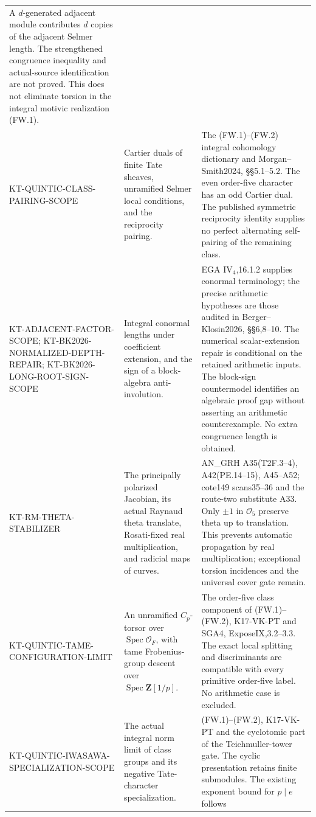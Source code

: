 \begin{longtable}{>{\raggedright\arraybackslash}p{}
>{\raggedright\arraybackslash}p{}
>{\raggedright\arraybackslash}p{}}
A $d$-generated adjacent module contributes $d$ copies of the
adjacent Selmer length. The strengthened congruence inequality
and actual-source identification are not proved. This does not
eliminate torsion in the integral motivic realization (FW.1).\\
KT-QUINTIC-CLASS-PAIRING-SCOPE &
Cartier duals of finite Tate sheaves, unramified Selmer local
conditions, and the reciprocity pairing. &
The (FW.1)--(FW.2) integral cohomology dictionary and
Morgan--Smith2024, \S\S5.1--5.2.
The even order-five character has an odd Cartier dual.
The published symmetric reciprocity identity supplies no
perfect alternating self-pairing of the remaining class.\\
KT-ADJACENT-FACTOR-SCOPE;
KT-BK2026-NORMALIZED-DEPTH-REPAIR;
KT-BK2026-LONG-ROOT-SIGN-SCOPE &
Integral conormal lengths under coefficient extension,
and the sign of a block-algebra anti-involution. &
EGA IV$_4$,16.1.2 supplies conormal terminology;
the precise arithmetic hypotheses are those audited in
Berger--Klosin2026, \S\S6,8--10.
The numerical scalar-extension repair is conditional on
the retained arithmetic inputs. The block-sign countermodel
identifies an algebraic proof gap without asserting an
arithmetic counterexample. No extra congruence length is obtained.\\
KT-RM-THETA-STABILIZER &
The principally polarized Jacobian, its actual Raynaud theta
translate, Rosati-fixed real multiplication, and radicial
maps of curves. &
AN\_GRH A35(T2F.3--4), A42(PE.14--15), A45--A52;
cote149 scans35--36 and the route-two substitute A33.
Only $\pm1$ in $\mathcal O_5$ preserve theta up to translation.
This prevents automatic propagation by real multiplication;
exceptional torsion incidences and the universal cover gate remain.\\
KT-QUINTIC-TAME-CONFIGURATION-LIMIT &
An unramified $C_p$-torsor over $\operatorname{Spec}\mathcal O_F$,
with tame Frobenius-group descent over $\operatorname{Spec}\mathbf Z[1/p]$. &
The order-five class component of (FW.1)--(FW.2),
K17-VK-PT and SGA4, ExposeIX,3.2--3.3.
The exact local splitting and discriminants are compatible
with every primitive order-five label. No arithmetic case is excluded.\\
KT-QUINTIC-IWASAWA-SPECIALIZATION-SCOPE &
The actual integral norm limit of class groups and its
negative Tate-character specialization. &
(FW.1)--(FW.2), K17-VK-PT and the cyclotomic part of the
Teichmuller-tower gate. The cyclic presentation retains finite
submodules. The existing exponent bound for $p\mid e$ follows

\end{longtable}
